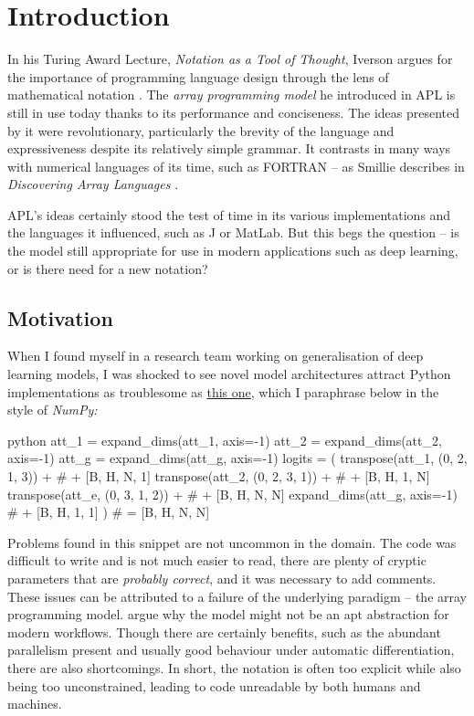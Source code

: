 \chapter{Introduction}

In his Turing Award Lecture, \textit{Notation as a Tool of Thought}, Iverson argues for the importance of programming language design through the lens of mathematical notation  \cite{iverson2007notation}. The \textit{array programming model} he introduced in APL is still in use today thanks to its performance and conciseness. The ideas presented by it were revolutionary, particularly the brevity of the language and expressiveness despite its relatively simple grammar. It contrasts in many ways with numerical languages of its time, such as FORTRAN -- as Smillie describes in \textit{Discovering Array Languages} \cite{smillie2000lecture}. 

APL's ideas certainly stood the test of time in its various implementations and the languages it influenced, such as J or MatLab. But this begs the question -- is the model still appropriate for use in modern applications such as deep learning, or is there need for a new notation?

\section{Motivation}

When I found myself in a research team working on generalisation of deep learning models, I was shocked to see novel model architectures attract Python implementations as troublesome as \href{https://github.com/google-deepmind/clrs/blob/8697f51663bd77548f4b3108816c84d163883361/clrs/_src/processors.py#L140}{this one}, which I paraphrase below in the style of \textit{NumPy:}
\begin{center}
\begin{cminted}{python}
att_1 = expand_dims(att_1, axis=-1)
att_2 = expand_dims(att_2, axis=-1)
att_g = expand_dims(att_g, axis=-1)
logits = (
    transpose(att_1, (0, 2, 1, 3)) +  # + [B, H, N, 1]
    transpose(att_2, (0, 2, 3, 1)) +  # + [B, H, 1, N]
    transpose(att_e, (0, 3, 1, 2)) +  # + [B, H, N, N]
    expand_dims(att_g, axis=-1)       # + [B, H, 1, 1]
)                                     # = [B, H, N, N]
\end{cminted}
\end{center}
Problems found in this snippet are not uncommon in the domain. The code was difficult to write and is not much easier to read, there are plenty of cryptic parameters that are \textit{probably correct}, and it was necessary to add comments. These issues can be attributed to a failure of the underlying paradigm -- the array programming model. \textcite{paszke2021getting} argue why the model might not be an apt abstraction for modern workflows. Though there are certainly benefits, such as the abundant parallelism present and usually good behaviour under automatic differentiation, there are also shortcomings. In short, the notation is often too explicit while also being too unconstrained, leading to code unreadable by both humans and machines. 

